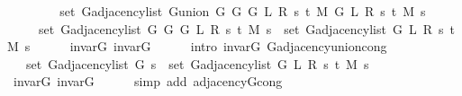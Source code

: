 \begin{isabellebody}
%
\isatagproof
{}\isamarkupfalse%
\ {\isacharminus}{\kern0pt}\isanewline
\ \ \isamarkupfalse%
\isanewline
\ \ \ \ {\isachardoublequoteopen}set\ {\isacharparenleft}{\kern0pt}G{\isachardot}{\kern0pt}adjacency{\isacharunderscore}{\kern0pt}list\ {\isacharparenleft}{\kern0pt}G{\isachardot}{\kern0pt}union\ {\isacharparenleft}{\kern0pt}G{}\ G\ {\isacharparenleft}{\kern0pt}G{}\ L\ R\ s\ t\ M{\isacharparenright}{\kern0pt}{\isacharparenright}{\kern0pt}\ {\isacharparenleft}{\kern0pt}G{}\ L\ R\ s\ t\ M{\isacharparenright}{\kern0pt}{\isacharparenright}{\kern0pt}\ s{\isacharparenright}{\kern0pt}\ {\isacharequal}{\kern0pt}\isanewline
\ \ \ \ \ set\ {\isacharparenleft}{\kern0pt}G{\isachardot}{\kern0pt}adjacency{\isacharunderscore}{\kern0pt}list\ {\isacharparenleft}{\kern0pt}G{}\ G\ {\isacharparenleft}{\kern0pt}G{}\ L\ R\ s\ t\ M{\isacharparenright}{\kern0pt}{\isacharparenright}{\kern0pt}\ s{\isacharparenright}{\kern0pt}\ {\isasymunion}\ set\ {\isacharparenleft}{\kern0pt}G{\isachardot}{\kern0pt}adjacency{\isacharunderscore}{\kern0pt}list\ {\isacharparenleft}{\kern0pt}G{}\ L\ R\ s\ t\ M{\isacharparenright}{\kern0pt}\ s{\isacharparenright}{\kern0pt}{\isachardoublequoteclose}\isanewline
\ \ \ \ \isamarkupfalse%
\ invar{\isacharunderscore}{\kern0pt}G\ invar{\isacharunderscore}{\kern0pt}G{}\isanewline
\ \ \ \ \isamarkupfalse%
\ {\isacharparenleft}{\kern0pt}intro\ invar{\isacharunderscore}{\kern0pt}G{}\ G{\isachardot}{\kern0pt}adjacency{\isacharunderscore}{\kern0pt}union{\isacharunderscore}{\kern0pt}cong{\isacharparenright}{\kern0pt}\isanewline
\ \ \isamarkupfalse%
\ \isamarkupfalse%
\ {\isachardoublequoteopen}{\isachardot}{\kern0pt}{\isachardot}{\kern0pt}{\isachardot}{\kern0pt}\ {\isacharequal}{\kern0pt}\ set\ {\isacharparenleft}{\kern0pt}G{\isachardot}{\kern0pt}adjacency{\isacharunderscore}{\kern0pt}list\ G\ s{\isacharparenright}{\kern0pt}\ {\isasymunion}\ set\ {\isacharparenleft}{\kern0pt}G{\isachardot}{\kern0pt}adjacency{\isacharunderscore}{\kern0pt}list\ {\isacharparenleft}{\kern0pt}G{}\ L\ R\ s\ t\ M{\isacharparenright}{\kern0pt}\ s{\isacharparenright}{\kern0pt}{\isachardoublequoteclose}\isanewline
\ \ \ \ \isamarkupfalse%
\ invar{\isacharunderscore}{\kern0pt}G\ invar{\isacharunderscore}{\kern0pt}G{}\isanewline
\ \ \ \ \isamarkupfalse%
\ {\isacharparenleft}{\kern0pt}simp\ add{\isacharcolon}{\kern0pt}\ adjacency{\isacharunderscore}{\kern0pt}G{}{\isacharunderscore}{\kern0pt}cong{\isacharparenright}{\kern0pt}\isanewline

\end{isabellebody}

